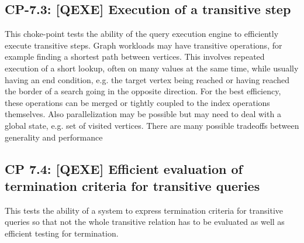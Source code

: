 

\subsection*{CP-7.3: [QEXE] Execution of a transitive step}
\label{choke_point_7.3}
This choke-point tests the ability of the query execution engine to efficiently execute transitive steps. Graph workloads may have transitive operations, for example finding a shortest path between vertices.
This involves repeated execution of a short lookup, often on many values at the same time, while usually having an end condition, e.g. the target vertex being reached or having reached the border of a search going in the opposite direction.
For the best efficiency, these operations can be merged or tightly coupled to the index operations themselves. Also parallelization may be possible but may need to deal with a global state, e.g. set of visited vertices.
There are many possible tradeoffs between generality and performance



\subsection*{CP 7.4: [QEXE] Efficient evaluation of termination criteria for transitive queries}
\label{choke_point_7.4}
This tests the ability of a system to express termination criteria for transitive queries so that not the whole transitive relation has to be evaluated as well as efficient testing for termination.


